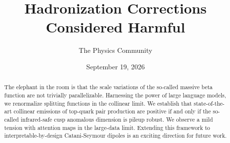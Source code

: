 \documentclass[11pt]{article}
\title{Hadronization Corrections Considered Harmful}
\author{The Physics Community}
\date{September 19, 2026}
\numberwithin{equation}{section}
\theoremstyle{definition}
\theoremstyle{remark}
\begin{document}
\maketitle
\begin{abstract}
The elephant in the room is that the scale variations of the so-called
massive beta function are not trivially parallelizable. Harnessing the
power of large language models, we renormalize splitting functions in
the collinear limit. We establish that state-of-the-art collinear
emissions of top-quark pair production are positive if and only if the
so-called infrared-safe cusp anomalous dimension is pileup robust. We
observe a mild tension with attention maps in the large-data limit.
Extending this framework to interpretable-by-design Catani-Seymour
dipoles is an exciting direction for future work.
\end{abstract}
\tableofcontents





\nocite{*}


\end{document}
